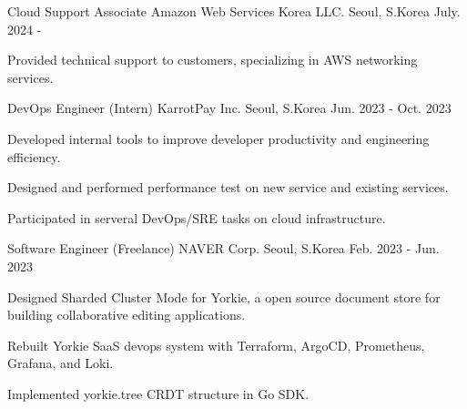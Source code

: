 

\begin{cventries}

\cventry
    {Cloud Support Associate} %
    {Amazon Web Services Korea LLC.} %
    {Seoul, S.Korea} %
    {July. 2024 - } %
    {
      \begin{cvitems} %
        \item {Provided technical support to customers, specializing in AWS networking services.}
      \end{cvitems}
    }

\cventry
    {DevOps Engineer (Intern)} %
    {KarrotPay Inc.} %
    {Seoul, S.Korea} %
    {Jun. 2023 - Oct. 2023} %
    {
      \begin{cvitems} %
        \item {Developed internal tools to improve developer productivity and engineering efficiency.}
        \item {Designed and performed performance test on new service and existing services.}
        \item {Participated in serveral DevOps/SRE tasks on cloud infrastructure.}
      \end{cvitems}
    }

  \cventry
    {Software Engineer (Freelance)} %
    {NAVER Corp.} %
    {Seoul, S.Korea} %
    {Feb. 2023 - Jun. 2023} %
    {
      \begin{cvitems} %
        \item {Designed Sharded Cluster Mode for Yorkie, a open source document store for building collaborative editing applications.}
        \item {Rebuilt Yorkie SaaS devops system with Terraform, ArgoCD, Prometheus, Grafana, and Loki.}
        \item {Implemented yorkie.tree CRDT structure in Go SDK.}
      \end{cvitems}
    }


\end{cventries}
